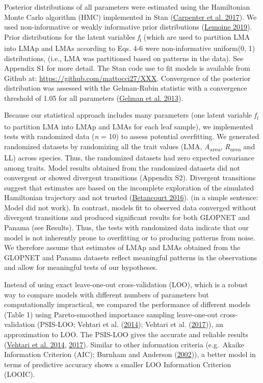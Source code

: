 \documentclass[
  12pt,
  a4paper,
,tablecaptionabove
]{scrartcl}
\begin{document}
Posterior distributions of all parameters were estimated using the
Hamiltonian Monte Carlo algorithm (HMC) implemented in Stan
(\protect\hyperlink{ref-Carpenter2017}{Carpenter et al. 2017}). We used
non-informative or weakly informative prior distributions
(\protect\hyperlink{ref-Lemoine2019}{Lemoine 2019}). Prior distributions
for the latent variables \emph{f}\textsubscript{i} (which are used to
partition LMA into LMAp and LMAs according to Eqs. 4-6 were
non-informative uniform(0, 1) distributions, (i.e., LMA was partitioned
based on patterns in the data). See Appendix S1 for more detail. The
Stan code use to fit models is available from Github at:
\href{https://github.com/mattocci27/xxx}{https://github.com/mattocci27/XXX}.
Convergence of the posterior distribution was assessed with the
Gelman-Rubin statistic with a convergence threshold of 1.05 for all
parameters (\protect\hyperlink{ref-Gelman2013}{Gelman et al. 2013}).

Because our statistical approach includes many parameters (one latent
variable \emph{f\textsubscript{i}} to partition LMA into LMAp and LMAs
for each leaf sample), we implemented tests with randomized data
(\emph{n} = 10) to assess potential overfitting. We generated randomized
datasets by randomizing all the trait values (LMA,
\emph{A}\textsubscript{area}, \emph{R}\textsubscript{area} and LL)
across species. Thus, the randomized datasets had zero expected
covariance among traits. Model results obtained from the randomized
datasets did not convergent or showed divergent transitions (Appendix
S2). Divergent transitions suggest that estimates are based on the
incomplete exploration of the simulated Hamiltonian trajectory and not
trusted (\protect\hyperlink{ref-Betancourt2016}{Betancourt 2016}). (in a
simple sentence: Model did not work). In contrast, models fit to
observed data converged without divergent transitions and produced
significant results for both GLOPNET and Panama (see Results). Thus, the
tests with randomized data indicate that our model is not inherently
prone to overfitting or to producing patterns from noise. We therefore
assume that estimates of LMAp and LMAs obtained from the GLOPNET and
Panama datasets reflect meaningful patterns in the observations and
allow for meaningful tests of our hypotheses.

Instead of using exact leave-one-out cross-validation (LOO), which is a
robust way to compare models with different numbers of parameters but
computationally impractical, we compared the performance of different
models (Table 1) using Pareto-smoothed importance sampling leave-one-out
cross-validation (PSIS-LOO; Vehtari et al.
(\protect\hyperlink{ref-Vehtari2014}{2014}); Vehtari et al.
(\protect\hyperlink{ref-Vehtari2017}{2017})), an approximation to LOO.
The PSIS-LOO gives the accurate and reliable results
(\protect\hyperlink{ref-Vehtari2014}{Vehtari et al. 2014},
\protect\hyperlink{ref-Vehtari2017}{2017}). Similar to other information
criteria (e.g.~Akaike Information Criterion (AIC); Burnham and Anderson
(\protect\hyperlink{ref-Burnham2002}{2002})), a better model in terms of
predictive accuracy shows a smaller LOO Information Criterion (LOOIC).
\end{document}

